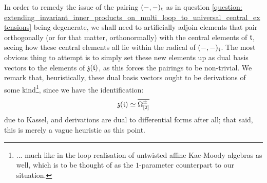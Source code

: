             \begin{remark} \label{remark: extending_toroidal_lie_algebras_by_derivations}
                In order to remedy the issue of the pairing $(-, -)_{\mathfrak{t}}$ as in question \ref{question: extending_invariant_inner_products_on_multi_loop_to_universal_central_extensions} being degenerate, we shall need to artificially adjoin elements that pair orthogonally (or for that matter, orthonormally) with the central elements of $\mathfrak{t}$, seeing how these central elements all lie within the radical of $(-, -)_{\mathfrak{t}}$. The most obvious thing to attempt is to simply set these new elements up as dual basis vectors to the elements of $\mathfrak{z}(\mathfrak{t})$, as this forces the pairings to be non-trivial. We remark that, heuristically, these dual basis vectors ought to be derivations of some kind\footnote{... much like in the loop realisation of untwisted affine Kac-Moody algebras as well, which is to be thought of as the $1$-parameter counterpart to our situation.}, since we have the identification:
                    $$\mathfrak{z}(\mathfrak{t}) \simeq \overline{\Omega^{\pm}_{[2]}}$$
                due to Kassel, and derivations are dual to differential forms after all; that said, this is merely a vague heuristic as this point.


\end{remark}
